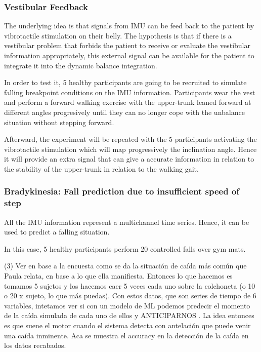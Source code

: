 \documentclass[conference]{IEEEtran}
\begin{document}

\subsubsection{Vestibular Feedback}

The underlying idea is that signals from IMU can be feed back to the patient by vibrotactile stimulation on their belly.  The hypothesis is that if there is a vestibular problem that forbids the patient to receive or evaluate the vestibular information appropriately, this external signal can be available for the patient to integrate it into the dynamic balance integration.

In order to test it, 5 healthy participants are going to be recruited to simulate falling breakpoint conditions on the IMU information.  Participants wear the vest and perform a forward walking exercise with the upper-trunk leaned forward at different angles progresively until they can no longer cope with the unbalance situation without stepping forward.

Afterward, the experiment will be repeated with the 5 participants activating the vibrotactile stimulation which will map progressively the inclination angle.  Hence it will provide an extra signal that can give a accurate information in relation to the stability of the upper-trunk in relation to the walking gait.

\subsubsection{Bradykinesia: Fall prediction due to insufficient speed of step}

All the IMU information represent a multichannel time series.  Hence, it can be used to predict a falling situation.   

In this case, 5 healthy participants perform 20 controlled falls over gym mats.  

(3) Ver en base a la encuesta como se da la situación de caída más común que Paula relata, en base a lo que ella manifiesta.  Entonces lo que hacemos es tomamos 5 sujetos y los hacemos caer 5 veces cada uno sobre la colchoneta (o 10 o 20 x sujeto, lo que más puedas).  Con estos datos, que son series de tiempo de 6 variables, intetamos ver si con un modelo de ML podemos predecir el momento de la caída simulada de cada uno de ellos y ANTICIPARNOS .  La idea entonces es que suene el motor cuando el sistema detecta con antelación que puede venir una caída inminente.  Aca se muestra el accuracy en la detección de la caída en los datos recabados.
\end{document}
